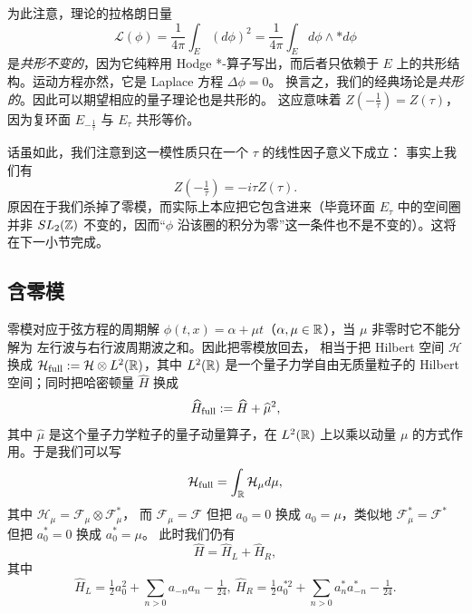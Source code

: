 为此注意，理论的拉格朗日量
$$
\mathcal L(\phi)=\frac{1}{4\pi}\int_E (d\phi)^2 =\frac{1}{4\pi}\int_E d\phi\wedge *d\phi
$$ 
是\emph{共形不变的}，因为它纯粹用 Hodge *-算子写出，而后者只依赖于 $E$ 上的共形结构。运动方程亦然，它是 Laplace 方程 $\Delta \phi=0$。
换言之，我们的经典场论是\emph{共形的}。因此可以期望相应的量子理论也是共形的。
这应意味着 $Z(-\tfrac{1}{\tau})=Z(\tau)$，因为复环面 $E_{-\frac{1}{\tau}}$ 与 $E_\tau$ 共形等价。

话虽如此，我们注意到这一模性质只在一个 $\tau$ 的线性因子意义下成立：
事实上我们有
$$
Z(-\tfrac{1}{\tau})=-i\tau Z(\tau). 
$$
原因在于我们杀掉了零模，而实际上本应把它包含进来（毕竟环面 $E_\tau$ 中的空间圈并非 $SL_2(\Bbb Z)$ 不变的，因而“$\phi$ 沿该圈的积分为零”这一条件也不是不变的）。这将在下一小节完成。


\subsection{含零模} 
 零模对应于弦方程的周期解
$\phi(t,x)=\alpha+\mu t$（$\alpha,\mu\in \Bbb R$），当 $\mu$ 非零时它不能分解为
左行波与右行波周期波之和。因此把零模放回去，
相当于把 Hilbert 空间 $\mathcal H$ 换成 $\mathcal H_{\rm full}:=\mathcal H\otimes L^2(\Bbb R)$，其中 $L^2(\Bbb R)$ 是一个量子力学自由无质量粒子的 Hilbert 空间；同时把哈密顿量 $\widehat H$ 换成
$$
\widehat H_{\rm full}:=\widehat H+\widehat \mu^2,
$$
其中 $\widehat\mu$ 是这个量子力学粒子的量子动量算子，在 $L^2(\Bbb R)$ 上以乘以动量 $\mu$ 的方式作用。于是我们可以写
$$
\mathcal H_{\rm full}=\int_{\Bbb R}\mathcal H_\mu d\mu,
$$
其中 $\mathcal H_\mu=\mathcal F_\mu\otimes \mathcal F_\mu^*$，
而 $\mathcal F_\mu=\mathcal F$ 但把 $a_0=0$ 换成 $a_0=\mu$，类似地
$\mathcal F_\mu^*=\mathcal F^*$ 但把 $a_0^*=0$ 换成 $a_0^*=\mu$。
此时我们仍有
$$
\widehat H=\widehat H_L+\widehat H_R,
$$
其中
$$
\widehat H_L=\tfrac{1}{2}a_0^2+\sum_{n>0}a_{-n}a_n-\tfrac{1}{24},\ \widehat H_R=\tfrac{1}{2}a_0^{*2}+\sum_{n>0}a_{n}^*a_{-n}^*-\tfrac{1}{24}.
$$

